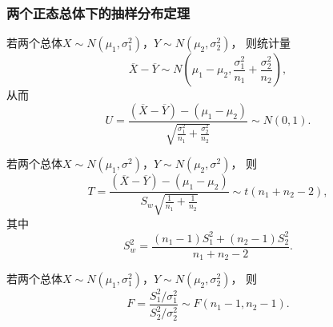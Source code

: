 \subsubsection{两个正态总体下的抽样分布定理}
\begin{theorem}
若两个总体\(X \sim N(\mu_1,\sigma_1^2)\)，\(Y \sim N(\mu_2,\sigma_2^2)\)，
则统计量\begin{equation}
	\overline{X}-\overline{Y}
	\sim
	N\left(\mu_1-\mu_2,\frac{\sigma_1^2}{n_1}+\frac{\sigma_2^2}{n_2}\right),
\end{equation}
从而\begin{equation}
	U = \frac{
		(\overline{X}-\overline{Y})-(\mu_1-\mu_2)
	}{
		\sqrt{\frac{\sigma_1^2}{n_1}+\frac{\sigma_2^2}{n_2}}
	}
	\sim
	N(0,1).
\end{equation}
\end{theorem}

\begin{theorem}
若两个总体\(X \sim N(\mu_1,\sigma^2)\)，\(Y \sim N(\mu_2,\sigma^2)\)，
则\begin{equation}
	T = \frac{
			(\overline{X}-\overline{Y})-(\mu_1-\mu_2)
		}{
			S_w \sqrt{\frac{1}{n_1}+\frac{1}{n_2}}
		}
	\sim
	t(n_1+n_2-2),
\end{equation}
其中\[
	S_w^2 = \frac{(n_1-1)S_1^2+(n_2-1)S_2^2}{n_1+n_2-2}.
\]
\end{theorem}

\begin{theorem}
若两个总体\(X \sim N(\mu_1,\sigma_1^2)\)，\(Y \sim N(\mu_2,\sigma_2^2)\)，
则\begin{equation}
	F = \frac{S_1^2 / \sigma_1^2}{S_2^2 / \sigma_2^2} \sim F(n_1-1,n_2-1).
\end{equation}
\end{theorem}

